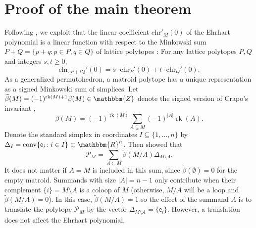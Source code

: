 \documentclass[pagesize,paper=A4,11pt,bibliography=totoc,oneside]{scrartcl}
\newcommand{\ZZ}{\mathbbm{Z}}
\newcommand{\RR}{\mathbbm{R}}
\newcommand{\abs}[1]{\left|#1\right|}
\newcommand{\set}[1]{\{#1\}}
\DeclareMathOperator{\rk}{rk}
\newcommand{\MP}[1]{\mathscr{P}_{#1}} %
\DeclareMathOperator{\conv}{conv}
\newcommand{\uv}{\mathsf{e}} %
\newcommand{\ehr}{\mathrm{ehr}}
\begin{document}
\section{Proof of the main theorem}\label{sec:ehr0-tutte}
Following \cite[\S4]{JochemkoRavichandran:PermuEhrPos}, we exploit that the linear coefficient $\ehr'_M(0)$ of the Ehrhart polynomial is a linear function with respect to the Minkowski sum $P+Q=\set{p+q\colon p\in P, q\in Q}$ of lattice polytopes \cite[Corollary~23]{BoroczkyLudwig:MinkowskiLattice}: For any lattice polytopes $P,Q$ and integers $s,t\geq 0$,
\begin{equation*}
    \ehr_{sP+tQ}'(0) = s\cdot \ehr_P'(0) + t\cdot \ehr_Q'(0)
    .
\end{equation*}
As a generalized permutohedron, a matroid polytope has a unique representation as a signed Minkowski sum of simplices.
Let $\widetilde{\beta}(M)=(-1)^{\rk(M)+1}\beta(M)\in\ZZ$ denote the signed version of Crapo's invariant \cite{Crapo:HigherInvariant},
\begin{equation*}%
  \beta(M)=(-1)^{\rk(M)} \sum_{A\subseteq M} (-1)^{\abs{A}} \rk(A).
\end{equation*}
Denote the standard simplex in coordinates $I\subseteq\{1,\ldots,n\}$ by $\Delta_I=\conv\{\uv_i\colon i\in I\}\subset \RR^n$. Then \cite[Theorem~2.5]{ArdilaBenedettiDoker:MatroidVolumes} showed that
\begin{equation*}
	\MP{M} = \sum_{A\subset M} \widetilde{\beta}(M/A) \Delta_{M\setminus A}.
\end{equation*}
It does not matter if $A=M$ is included in this sum, since $\widetilde{\beta}(\emptyset)=0$ for the empty matroid. Summands with size $\abs{A}=n-1$ only contribute when their complement $\set{i}=M\setminus A$ is a coloop of $M$ (otherwise, $M/A$ will be a loop and $\widetilde{\beta}(M/A)=0$). In this case, $\widetilde{\beta}(M/A)=1$ so the effect of the summand $A$ is to translate the polytope $\MP{M}$ by the vector $\Delta_{M\setminus A}=\set{\uv_i}$. However, a translation does not affect the Ehrhart polynomial.
\end{document}
